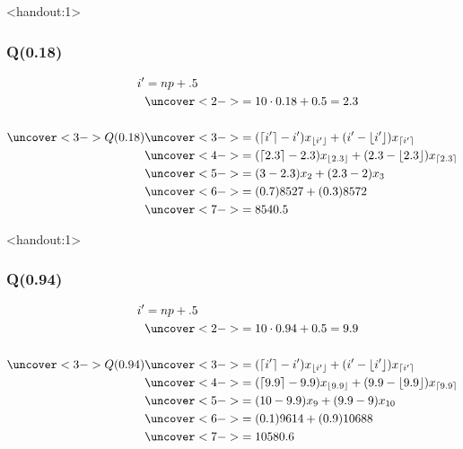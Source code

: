 \documentclass[handout]{beamer}
\newcommand{\answers}{1}
\numberwithin{equation}{section}
\begin{document}
\begin{frame}<handout:\answers>
\frametitle{Q(0.18)}
\begin{align*}
i' &= np + .5 \\
&\uncover<2->{=10 \cdot 0.18 + 0.5 = 2.3} \\ \\
\uncover<3->{Q(0.18)} &\uncover<3->{=   (\lceil i' \rceil -i')x_{\lfloor i' \rfloor} + (i'-\lfloor i' \rfloor)x_{\lceil i' \rceil} }\\
&\uncover<4->{=(\lceil 2.3 \rceil - 2.3)x_{\lfloor 2.3 \rfloor} + (2.3 - \lfloor 2.3 \rfloor)x_{\lceil 2.3 \rceil}} \\
& \uncover<5->{= (3 - 2.3) x_2 + (2.3 - 2) x_3} \\
& \uncover<6->{= (0.7) 8527 + (0.3) 8572} \\
&\uncover<7->{= 8540.5}
\end{align*}
\end{frame}

\begin{frame}<handout:\answers>
\frametitle{Q(0.94)}
\begin{align*}
i' &= np + .5 \\
&\uncover<2->{=10 \cdot 0.94 + 0.5 = 9.9 }\\ \\
\uncover<3->{Q(0.94)} &\uncover<3->{=   (\lceil i' \rceil -i')x_{\lfloor i' \rfloor} + (i'-\lfloor i' \rfloor)x_{\lceil i' \rceil}} \\
&\uncover<4->{=(\lceil 9.9 \rceil - 9.9)x_{\lfloor 9.9 \rfloor} + (9.9 - \lfloor 9.9 \rfloor)x_{\lceil 9.9 \rceil}} \\
&\uncover<5->{ = (10 - 9.9) x_9 + (9.9 - 9) x_{10}} \\
&\uncover<6->{ = (0.1) 9614+ (0.9)10688 } \\
&\uncover<7->{= 10580.6}
\end{align*}
\end{frame}
\end{document}
